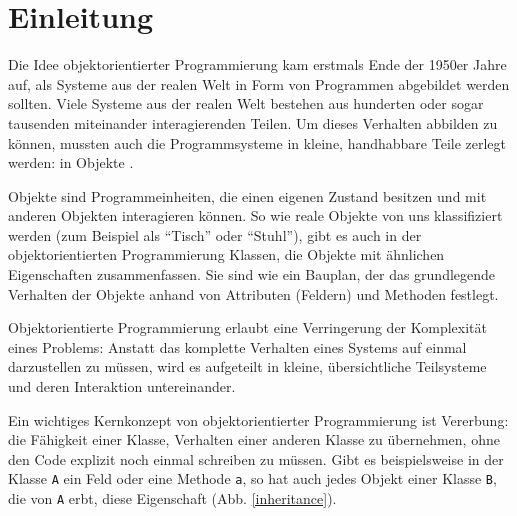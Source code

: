 \chapter{Einleitung} 
Die Idee objektorientierter Programmierung kam erstmals Ende der 1950er Jahre auf, als Systeme aus der realen Welt in Form von Programmen abgebildet werden sollten. Viele Systeme aus der realen Welt bestehen aus hunderten oder sogar tausenden miteinander interagierenden Teilen. Um dieses Verhalten abbilden zu können, mussten auch die Programmsysteme in kleine, handhabbare Teile zerlegt werden: in Objekte \cite{history}.

Objekte sind Programmeinheiten, die einen eigenen Zustand besitzen und mit anderen Objekten interagieren können. So wie reale Objekte von uns klassifiziert werden (zum Beispiel als ``Tisch'' oder ``Stuhl''), gibt es auch in der objektorientierten Programmierung Klassen, die Objekte mit ähnlichen Eigenschaften zusammenfassen. Sie sind wie ein Bauplan, der das grundlegende Verhalten der Objekte anhand von Attributen (Feldern) und Methoden festlegt.

Objektorientierte Programmierung erlaubt eine Verringerung der Komplexität eines Problems: Anstatt das komplette Verhalten eines Systems auf einmal darzustellen zu müssen, wird es aufgeteilt in kleine, übersichtliche Teilsysteme und deren Interaktion untereinander.

Ein wichtiges Kernkonzept von objektorientierter Programmierung ist Vererbung: die Fähigkeit einer Klasse, Verhalten einer anderen Klasse zu übernehmen, ohne den Code explizit noch einmal schreiben zu müssen. Gibt es beispielsweise in der Klasse \texttt{A} ein Feld oder eine Methode \texttt{a}, so hat auch jedes Objekt einer Klasse \texttt{B}, die von \texttt{A} erbt, diese Eigenschaft (Abb. \ref{inheritance}).

